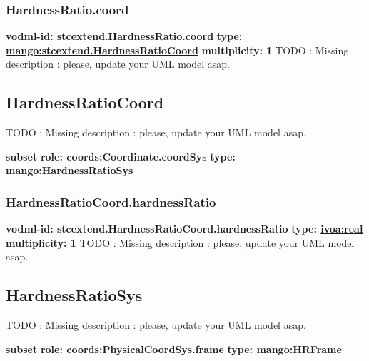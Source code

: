     \subsubsection{HardnessRatio.coord}
      \textbf{vodml-id: stcextend.HardnessRatio.coord} \newline
      \textbf{type: \hyperref[sect:stcextend.HardnessRatioCoord]{mango:stcextend.HardnessRatioCoord}} \newline
      \textbf{multiplicity: 1} \newline 
      TODO : Missing description : please, update your UML model asap.

  \subsection{HardnessRatioCoord}
  \label{sect:stcextend.HardnessRatioCoord}
    TODO : Missing description : please, update your UML model asap.

    \noindent \textbf{subset} \newline
    \indent   \textbf{role: coords:Coordinate.coordSys} \newline
    \indent   \textbf{type: mango:HardnessRatioSys} \newline


    \subsubsection{HardnessRatioCoord.hardnessRatio}
      \textbf{vodml-id: stcextend.HardnessRatioCoord.hardnessRatio} \newline
      \textbf{type: \hyperref[sect:ivoa]{ivoa:real}} \newline
      \textbf{multiplicity: 1} \newline 
      TODO : Missing description : please, update your UML model asap.

  \subsection{HardnessRatioSys}
  \label{sect:stcextend.HardnessRatioSys}
    TODO : Missing description : please, update your UML model asap.

    \noindent \textbf{subset} \newline
    \indent   \textbf{role: coords:PhysicalCoordSys.frame} \newline
    \indent   \textbf{type: mango:HRFrame} \newline


